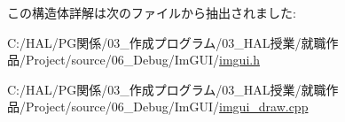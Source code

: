 この構造体詳解は次のファイルから抽出されました\+:\begin{DoxyCompactItemize}
\item 
C\+:/\+H\+A\+L/\+P\+G関係/03\+\_\+作成プログラム/03\+\_\+\+H\+A\+L授業/就職作品/\+Project/source/06\+\_\+\+Debug/\+Im\+G\+U\+I/\mbox{\hyperlink{imgui_8h}{imgui.\+h}}\item 
C\+:/\+H\+A\+L/\+P\+G関係/03\+\_\+作成プログラム/03\+\_\+\+H\+A\+L授業/就職作品/\+Project/source/06\+\_\+\+Debug/\+Im\+G\+U\+I/\mbox{\hyperlink{imgui__draw_8cpp}{imgui\+\_\+draw.\+cpp}}\end{DoxyCompactItemize}
